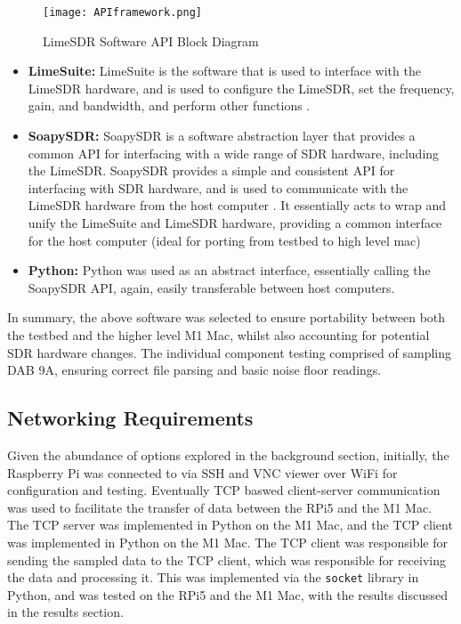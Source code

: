 \begin{figure}[htbp]
    \centering
    \texttt{[image: APIframework.png]}
    \caption{LimeSDR Software API Block Diagram}
    \label{fig:limeSDRapi}
\end{figure}

\begin{itemize}
    \item \textbf{LimeSuite:} LimeSuite is the software that is used to interface with the LimeSDR hardware, and is used to configure the LimeSDR, set the frequency, gain, and bandwidth, and perform other functions \cite{limesdr_usb}. 
    \item \textbf{SoapySDR:} SoapySDR \cite{soapsdr} is a software abstraction layer that provides a common API for interfacing with a wide range of SDR hardware, including the LimeSDR. SoapySDR provides a simple and consistent API for interfacing with SDR hardware, and is used to communicate with the LimeSDR hardware from the host computer \cite{soapsdr}. It essentially acts to wrap and unify the LimeSuite and LimeSDR hardware, providing a common interface for the host computer (ideal for porting from testbed to high level mac)
    \item \textbf{Python:} Python was used as an abstract interface, essentially calling the SoapySDR API, again, easily transferable between host computers. 
\end{itemize}

In summary, the above software was selected to ensure portability between both the testbed and the higher level M1 Mac, whilst also accounting for potential SDR hardware changes. The individual component testing comprised of sampling DAB 9A, ensuring correct file parsing and basic noise floor readings.

\subsection{Networking Requirements \label{sec:networking}}
Given the abundance of options explored in the background section, initially, the Raspberry Pi was connected to via SSH and VNC viewer over WiFi for configuration and testing. Eventually TCP baswed client-server communication was used to facilitate the transfer of data between the RPi5 and the M1 Mac. The TCP server was implemented in Python on the M1 Mac, and the TCP client was implemented in Python on the M1 Mac. The TCP client was responsible for sending the sampled data to the TCP client, which was responsible for receiving the data and processing it. This was implemented via the \texttt{socket} library in Python, and was tested on the RPi5 and the M1 Mac, with the results discussed in the results section.


